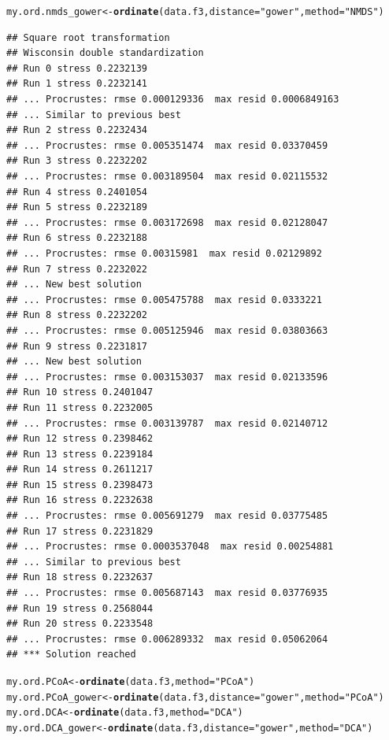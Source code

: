 \documentclass[12pt]{article}\usepackage[]{graphicx}\usepackage[]{color}
\makeatletter
\newcommand{\hlstr}[1]{\textcolor[rgb]{0.192,0.494,0.8}{#1}}%
\newcommand{\hlstd}[1]{\textcolor[rgb]{0.345,0.345,0.345}{#1}}%
\newcommand{\hlkwb}[1]{\textcolor[rgb]{0.69,0.353,0.396}{#1}}%
\newcommand{\hlkwc}[1]{\textcolor[rgb]{0.333,0.667,0.333}{#1}}%
\newcommand{\hlkwd}[1]{\textcolor[rgb]{0.737,0.353,0.396}{\textbf{#1}}}%
\newenvironment{kframe}{%
 \def\at@end@of@kframe{}%
 \ifinner\ifhmode%
  \def\at@end@of@kframe{\end{minipage}}%
  \begin{minipage}{\columnwidth}%
 \fi\fi%
 \def\FrameCommand##1{\hskip\@totalleftmargin \hskip-\fboxsep
 \colorbox{shadecolor}{##1}\hskip-\fboxsep
     \hskip-\linewidth \hskip-\@totalleftmargin \hskip\columnwidth}%
 \MakeFramed {\advance\hsize-\width
   \@totalleftmargin\z@ \linewidth\hsize
   \@setminipage}}%
 {\par\unskip\endMakeFramed%
 \at@end@of@kframe}
\newenvironment{knitrout}{}{} %
\numberwithin{figure}{section}
\makeatother
\begin{document}
\begin{knitrout}\small
{}\color{fgcolor}\begin{kframe}
\begin{alltt}
\hlstd{my.ord.nmds_gower} \hlkwb{<-} \hlkwd{ordinate}\hlstd{(data.f3,} \hlkwc{distance} \hlstd{=} \hlstr{"gower"}\hlstd{,}  \hlkwc{method} \hlstd{=} \hlstr{"NMDS"}\hlstd{)}
\end{alltt}
\begin{verbatim}
## Square root transformation
## Wisconsin double standardization
## Run 0 stress 0.2232139 
## Run 1 stress 0.2232141 
## ... Procrustes: rmse 0.000129336  max resid 0.0006849163 
## ... Similar to previous best
## Run 2 stress 0.2232434 
## ... Procrustes: rmse 0.005351474  max resid 0.03370459 
## Run 3 stress 0.2232202 
## ... Procrustes: rmse 0.003189504  max resid 0.02115532 
## Run 4 stress 0.2401054 
## Run 5 stress 0.2232189 
## ... Procrustes: rmse 0.003172698  max resid 0.02128047 
## Run 6 stress 0.2232188 
## ... Procrustes: rmse 0.00315981  max resid 0.02129892 
## Run 7 stress 0.2232022 
## ... New best solution
## ... Procrustes: rmse 0.005475788  max resid 0.0333221 
## Run 8 stress 0.2232202 
## ... Procrustes: rmse 0.005125946  max resid 0.03803663 
## Run 9 stress 0.2231817 
## ... New best solution
## ... Procrustes: rmse 0.003153037  max resid 0.02133596 
## Run 10 stress 0.2401047 
## Run 11 stress 0.2232005 
## ... Procrustes: rmse 0.003139787  max resid 0.02140712 
## Run 12 stress 0.2398462 
## Run 13 stress 0.2239184 
## Run 14 stress 0.2611217 
## Run 15 stress 0.2398473 
## Run 16 stress 0.2232638 
## ... Procrustes: rmse 0.005691279  max resid 0.03775485 
## Run 17 stress 0.2231829 
## ... Procrustes: rmse 0.0003537048  max resid 0.00254881 
## ... Similar to previous best
## Run 18 stress 0.2232637 
## ... Procrustes: rmse 0.005687143  max resid 0.03776935 
## Run 19 stress 0.2568044 
## Run 20 stress 0.2233548 
## ... Procrustes: rmse 0.006289332  max resid 0.05062064 
## *** Solution reached
\end{verbatim}
\begin{alltt}
\hlstd{my.ord.PCoA} \hlkwb{<-} \hlkwd{ordinate}\hlstd{(data.f3,} \hlkwc{method} \hlstd{=} \hlstr{"PCoA"}\hlstd{)}
\hlstd{my.ord.PCoA_gower} \hlkwb{<-} \hlkwd{ordinate}\hlstd{(data.f3,} \hlkwc{distance} \hlstd{=} \hlstr{"gower"}\hlstd{,} \hlkwc{method} \hlstd{=} \hlstr{"PCoA"}\hlstd{)}
\hlstd{my.ord.DCA} \hlkwb{<-} \hlkwd{ordinate}\hlstd{(data.f3,} \hlkwc{method} \hlstd{=} \hlstr{"DCA"}\hlstd{)}
\hlstd{my.ord.DCA_gower} \hlkwb{<-} \hlkwd{ordinate}\hlstd{(data.f3,} \hlkwc{distance} \hlstd{=} \hlstr{"gower"}\hlstd{,} \hlkwc{method} \hlstd{=} \hlstr{"DCA"}\hlstd{)}


\end{alltt}
\end{kframe}
\end{knitrout}
\end{document}
